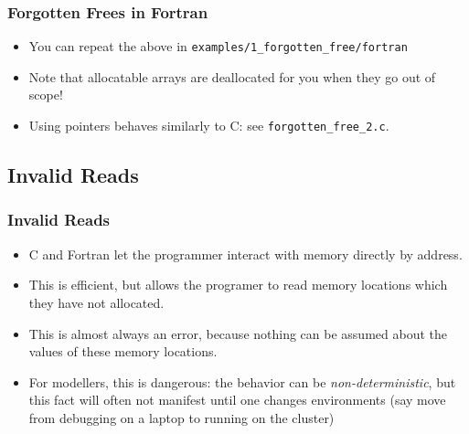\documentclass{beamer}
\begin{document}
\begin{frame}[fragile]
  \frametitle{Forgotten Frees in Fortran}
  \begin{itemize}
    \item You can repeat the above in \texttt{examples/1\_forgotten\_free/fortran}
      \item Note that allocatable arrays are deallocated for you when they go out of scope!
      \item Using pointers behaves similarly to C: see \texttt{forgotten\_free\_2.c}.
  \end{itemize}

\end{frame}


\subsection{Invalid Reads}

\begin{frame}[fragile]
  \frametitle{Invalid Reads}
  \begin{itemize}
    \item C and Fortran let the programmer interact with memory directly by address.
      \item This is efficient, but allows the programer to read memory locations which they have not allocated. 
        \item This is almost always an error, because nothing can be assumed about the values of these memory locations.
        \item For modellers, this is dangerous: the behavior can be \emph{non-deterministic}, but this fact will often not manifest until one changes environments (say move from debugging on a laptop to running on the cluster)
  \end{itemize}
\end{frame}
\end{document}
